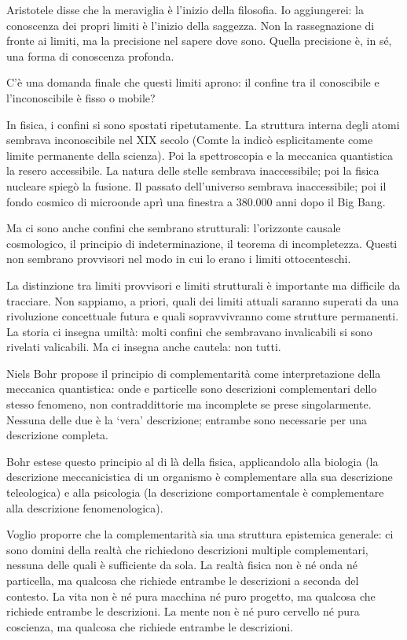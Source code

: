 \documentclass[12pt,a4paper,openany]{book}
\newcommand{\sezione}[1]{\vspace{1.2em}{\large\bfseries #1}\vspace{0.5em}\par}
\begin{document}
Aristotele disse che la meraviglia è l'inizio della filosofia. Io aggiungerei: la conoscenza dei propri limiti è l'inizio della saggezza. Non la rassegnazione di fronte ai limiti, ma la precisione nel sapere dove sono. Quella precisione è, in sé, una forma di conoscenza profonda.

\sezione{Il confine tra conoscibile e inconoscibile}

C'è una domanda finale che questi limiti aprono: il confine tra il conoscibile e l'inconoscibile è fisso o mobile?

In fisica, i confini si sono spostati ripetutamente. La struttura interna degli atomi sembrava inconoscibile nel XIX secolo (Comte la indicò esplicitamente come limite permanente della scienza). Poi la spettroscopia e la meccanica quantistica la resero accessibile. La natura delle stelle sembrava inaccessibile; poi la fisica nucleare spiegò la fusione. Il passato dell'universo sembrava inaccessibile; poi il fondo cosmico di microonde aprì una finestra a 380.000 anni dopo il Big Bang.

Ma ci sono anche confini che sembrano strutturali: l'orizzonte causale cosmologico, il principio di indeterminazione, il teorema di incompletezza. Questi non sembrano provvisori nel modo in cui lo erano i limiti ottocenteschi.

La distinzione tra limiti provvisori e limiti strutturali è importante ma difficile da tracciare. Non sappiamo, a priori, quali dei limiti attuali saranno superati da una rivoluzione concettuale futura e quali sopravvivranno come strutture permanenti. La storia ci insegna umiltà: molti confini che sembravano invalicabili si sono rivelati valicabili. Ma ci insegna anche cautela: non tutti.

\sezione{La complementarità come struttura epistemica}

Niels Bohr propose il principio di complementarità come interpretazione della meccanica quantistica: onde e particelle sono descrizioni complementari dello stesso fenomeno, non contraddittorie ma incomplete se prese singolarmente. Nessuna delle due è la `vera' descrizione; entrambe sono necessarie per una descrizione completa.

Bohr estese questo principio al di là della fisica, applicandolo alla biologia (la descrizione meccanicistica di un organismo è complementare alla sua descrizione teleologica) e alla psicologia (la descrizione comportamentale è complementare alla descrizione fenomenologica).

Voglio proporre che la complementarità sia una struttura epistemica generale: ci sono domini della realtà che richiedono descrizioni multiple complementari, nessuna delle quali è sufficiente da sola. La realtà fisica non è né onda né particella, ma qualcosa che richiede entrambe le descrizioni a seconda del contesto. La vita non è né pura macchina né puro progetto, ma qualcosa che richiede entrambe le descrizioni. La mente non è né puro cervello né pura coscienza, ma qualcosa che richiede entrambe le descrizioni.
\end{document}
